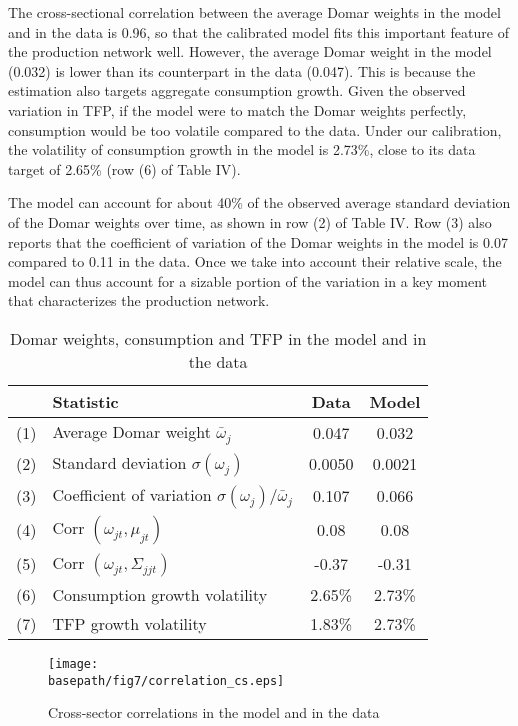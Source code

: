 \documentclass[11pt]{article}
\theoremstyle{definition}
\newcommand{\basepath}{F:/12004835/replication_package_final/replication_package_final/output_figures}
\begin{document}
	The cross-sectional correlation between the average Domar weights in the model and in the data is 0.96, so that the calibrated model fits this important feature of the production network well. However, the average Domar weight in the model (0.032) is lower than its counterpart in the data (0.047). This is because the estimation also targets aggregate consumption growth. Given the observed variation in TFP, if the model were to match the Domar weights perfectly, consumption would be too volatile compared to the data. Under our calibration, the volatility of consumption growth in the model is 2.73\%, close to its data target of 2.65\% (row (6) of Table IV).
	
	The model can account for about 40\% of the observed average standard deviation of the Domar weights over time, as shown in row (2) of Table IV. Row (3) also reports that the coefficient of variation of the Domar weights in the model is 0.07 compared to 0.11 in the data. Once we take into account their relative scale, the model can thus account for a sizable portion of the variation in a key moment that characterizes the production network.
	
	\setcounter{table}{3}
	\begin{table}[ht]
		\centering
		\caption{Domar weights, consumption and TFP in the model and in the data}
		\begin{tabular}{clcc}
			\hline
			& \textbf{Statistic} & \textbf{Data} & \textbf{Model} \\
			\hline
			(1) & Average Domar weight $\bar{\omega}_j$ & 0.047 & 0.032 \\
			(2) & Standard deviation $\sigma(\omega_j)$ & 0.0050 & 0.0021 \\
			(3) & Coefficient of variation $\sigma(\omega_j)/\bar{\omega}_j$ & 0.107 & 0.066 \\
			(4) & Corr $(\omega_{jt}, \mu_{jt})$ & 0.08 & 0.08 \\
			(5) & Corr $(\omega_{jt}, \Sigma_{jjt})$ & -0.37 & -0.31 \\
			(6) & Consumption growth volatility & 2.65\% & 2.73\% \\
			(7) & TFP growth volatility & 1.83\% & 2.73\% \\
			\hline
		\end{tabular}
	\end{table}
	
	\begin{figure}[ht]
		\centering
		\caption{Cross-sector correlations in the model and in the data}
		\texttt{[image: \\basepath/fig7/correlation\_cs.eps]}
		\label{fig:7}
	\end{figure}
	
\end{document}
